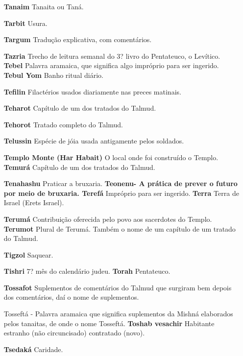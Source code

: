\begin{itemize}
\begin{enumrate}
\begin{itemize}
\begin{itemize}
\begin{itemize}
\begin{itemize}
\begin{itemize}
\item[\textbf{Tanaim}] Tanaita ou Taná.

\item[\textbf{Tarbit}] Usura.

\item[\textbf{Targum}] Tradução explicativa, com comentários.

\item[\textbf{Tazria}] Trecho de leitura semanal do 3? livro do Pentateuco, o
Levítico. \textbf{Tebel} Palavra aramaica, que signifi­ca algo
impróprio para ser ingerido. \textbf{Tebul Yom} Banho ritual diário.
\item[\textbf{Tefilin}] Filactérios usados diariamen­te nas preces matinais.

\item[\textbf{Teharot}] Capítulo de um dos tratados do Talmud.

\item[\textbf{Tehorot}] Tratado completo do Tal­mud.

\item[\textbf{Telussin}] Espécie de jóia usada anti­gamente pelos soldados.

\item[\textbf{Templo Monte (Har Habait)}] O lo­cal onde foi construído o
Templo. \textbf{Temurá} Capítulo de um dos tratados do Talmud.

\item[\textbf{Tenahashu}] Praticar a bruxaria. \textbf{Teonenu- A prática de
prever o fu­turo por meio de bruxaria. Terefá} Impróprio para ser
ingerido. \textbf{Terra} Terra de Israel (Erets Israel).
\item[\textbf{Terumá}] Contribuição oferecida pe­lo povo aos sacerdotes do
Templo. \textbf{Terumot} Plural de Terumá. Também o nome de um
capítulo de um tratado do Talmud.

\item[\textbf{Tigzol}] Saquear.

\item[\textbf{Tishri} 7? mês do calendário judeu. \textbf{Torah}]
Pentateuco.

\item[\textbf{Tossafot}] Suplementos de comentá­rios do Talmud que surgiram
bem de­pois dos comentários, daí o nome de suplementos.

Tosseftá - Palavra aramaica que signifi­ca suplementos da Mishná
elaborados pelos tanaitas, de onde o nome Tosseftá. \textbf{Toshab
vesachir} Habitante estranho (não circuncisado) contratado (novo).
\item[\textbf{Tsedaká}] Caridade.


\end{itemize}
\end{itemize}
\end{itemize}
\end{itemize}
\end{itemize}
\end{enumrate}
\end{itemize}
